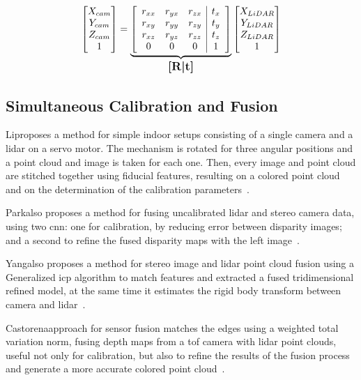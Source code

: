 \begin{equation}
	\label{eq:jointRotationTranslationTransform}
	\begin{bmatrix}
		X_{cam} \\
		Y_{cam} \\
		Z_{cam} \\
		1
	\end{bmatrix}
	= 
		\underbrace{
	\left[
			\begin{array}{ccc|c}
				r_{xx} & r_{yx} & r_{zx} & t_x \\
					r_{xy} & r_{yy} & r_{zy} & t_y \\
					r_{xz} & r_{yz} & r_{zz} & t_z \\
					0      & 0      & 0      & 1 
				\end{array}
		\right]
		}_\text{\large\textbf{[R|t]}}
	\begin{bmatrix}
		X_{LiDAR} \\
		Y_{LiDAR} \\
		Z_{LiDAR} \\
		1
	\end{bmatrix}
\end{equation}


\subsection{Simultaneous Calibration and Fusion}
\label{subsec:sota:simultaneous-calibration-fusion}
Li\etal proposes a method for simple indoor setups consisting of a single camera and a \ac{lidar} on a servo motor. The mechanism is rotated for three angular positions and a point cloud and image is taken for each one. Then, every image and point cloud are stitched together using fiducial features, resulting on a colored point cloud and on the determination of the calibration parameters~\cite{Li2016}. 

Park\etal also proposes a method for fusing uncalibrated \ac{lidar} and stereo camera data, using two \ac{cnn}: one for calibration, by reducing error between disparity images; and a second to refine the fused disparity maps with the left image~\cite{Park2019}. 

Yang\etal also proposes a method for stereo image and \ac{lidar} point cloud fusion using a Generalized \acl{icp} algorithm to match features and extracted a fused tridimensional refined model, at the same time it estimates the rigid body transform between camera and \ac{lidar}~\cite{Yang2017}.

Castorena\etal approach for sensor fusion matches the edges using a weighted total variation norm, fusing depth maps from a \ac{tof} camera with \ac{lidar} point clouds, useful not only for calibration, but also to refine the results of the fusion process and generate a more accurate colored point cloud~\cite{Castorena2016}.

